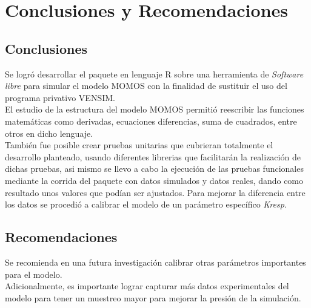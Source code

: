 \chapter{Conclusiones y Recomendaciones}

\section{Conclusiones}

Se logr\'o desarrollar el paquete en lenguaje R sobre una herramienta de \textit{Software libre} para simular el modelo MOMOS con la finalidad de sustituir el uso del programa privativo VENSIM.\\

El estudio de la estructura del modelo MOMOS permiti\'o reescribir las funciones matem\'aticas como derivadas, ecuaciones diferencias, suma de cuadrados, entre otros en dicho lenguaje.\\

Tambi\'en fue posible crear pruebas unitarias que cubrieran totalmente el desarrollo planteado, usando diferentes librerias que facilitar\'an la realizaci\'on de dichas pruebas, asi mismo se llevo a cabo la ejecuci\'on de las pruebas funcionales mediante la corrida del paquete con datos simulados y datos reales, dando como resultado unos valores que pod\'ian ser ajustados. Para mejorar la diferencia entre los datos se procedi\'o a calibrar el modelo de un par\'ametro espec\'ifico \textit{Kresp}.\\

\section{Recomendaciones}

Se recomienda en una futura investigaci\'on calibrar otras par\'ametros importantes para el modelo.\\

Adicionalmente, es importante lograr capturar m\'as datos experimentales del modelo para tener un muestreo mayor para mejorar la presi\'on de la simulaci\'on.